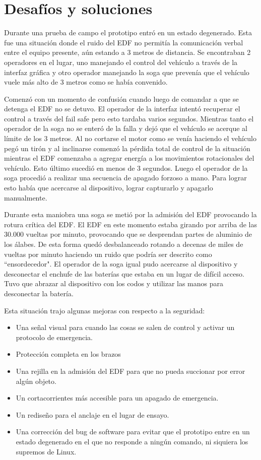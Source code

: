 \section{Desafíos y soluciones}\label{sec:challenges-solutions}
Durante una prueba de campo el prototipo entró en un estado degenerado. Esta fue una situación donde el ruido del EDF no permitía la comunicación verbal entre el equipo presente, aún estando a 3 metros de distancia. Se encontraban 2 operadores en el lugar, uno manejando el control del vehículo a través de la interfaz gráfica y otro operador manejando la soga que prevenía que el vehículo vuele más alto de 3 metros como se había convenido.

Comenzó con un momento de confusión cuando luego de comandar a que se detenga el EDF no se detuvo. El operador de la interfaz intentó recuperar el control a través del fail safe pero esto tardaba varios segundos. Mientras tanto el operador de la soga no se enteró de la falla y dejó que el vehículo se acerque al límite de los 3 metros. Al no cortarse el motor como se venía haciendo el vehículo pegó un tirón y al inclinarse comenzó la pérdida total de control de la situación mientras el EDF comenzaba a agregar energía a los movimientos rotacionales del vehículo. Esto último sucedió en menos de 3 segundos. Luego el operador de la soga procedió a realizar una secuencia de apagado forzoso a mano. Para lograr esto había que acercarse al dispositivo, lograr capturarlo y apagarlo manualmente.

Durante esta maniobra una soga se metió por la admisión del EDF provocando la rotura crítica del EDF. El EDF en este momento estaba girando por arriba de las 30.000 vueltas por minuto, provocando que se desprendan partes de aluminio de los álabes. De esta forma quedó desbalanceado rotando a decenas de miles de vueltas por minuto haciendo un ruido que podría ser descrito como ``ensordecedor". El operador de la soga igual pudo acercarse al dispositivo y desconectar el enchufe de las baterías que estaba en un lugar de difícil acceso. Tuvo que abrazar al dispositivo con los codos y utilizar las manos para desconectar la batería.

Esta situación trajo algunas mejoras con respecto a la seguridad:

\begin{itemize}
    \item Una señal visual para cuando las cosas se salen de control y activar un protocolo de emergencia.
    \item Protección completa en los brazos
    \item Una rejilla en la admisión del EDF para que no pueda succionar por error algún objeto.
    \item Un cortacorrientes más accesible para un apagado de emergencia.
    \item Un rediseño para el anclaje en el lugar de ensayo.
    \item Una corrección del bug de software para evitar que el prototipo entre en un estado degenerado en el que no responde a ningún comando, ni siquiera los supremos de Linux.
\end{itemize}

